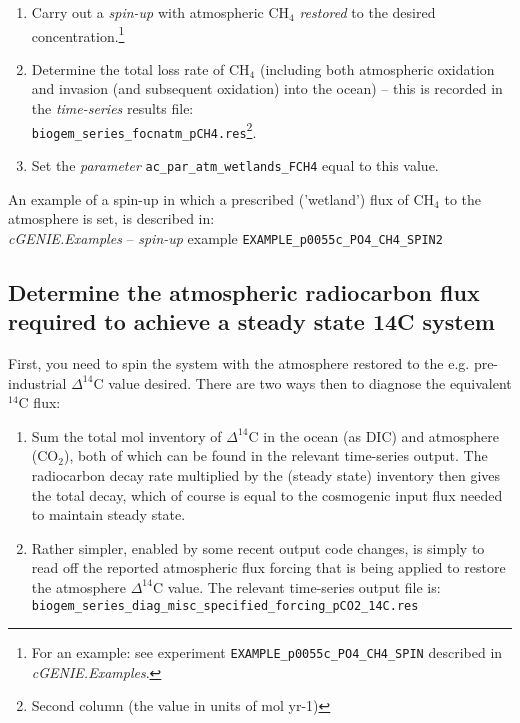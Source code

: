 \begin{enumerate}[noitemsep]

\vspace{1mm}
        \item Carry out a \textit{spin-up} with atmospheric CH\(_{4}\) \textit{restored} to the desired concentration.\footnote{For an example: see experiment \texttt{EXAMPLE\_p0055c\_PO4\_CH4\_SPIN} described in \textit{cGENIE.Examples}.}

\vspace{1mm}
        \item Determine the total loss rate of CH\(_{4}\) (including both atmospheric oxidation and invasion (and subsequent oxidation) into the ocean) -- this is recorded in the \textit{time-series} results file:\\ \texttt{biogem\_series\_focnatm\_pCH4.res}\footnote{Second column (the value in units of mol yr-1)}.

\vspace{1mm}
        \item Set the \textit{parameter} \texttt{ac\_par\_atm\_wetlands\_FCH4} equal to this value.
\end{enumerate}

An example of a spin-up in which a prescribed ('wetland') flux of CH\(_{4}\) to the atmosphere is set, is described in:\\ \textit{cGENIE.Examples} -- \textit{spin-up} example \texttt{EXAMPLE\_p0055c\_PO4\_CH4\_SPIN2}

%
\newpage
\subsection*{Determine the atmospheric radiocarbon flux required to achieve a steady state 14C system}
\vspace{1mm}

First, you need to spin the system with the atmosphere restored to the e.g. pre-industrial \(\Delta^{14}\)C value desired. There are two ways then to diagnose the equivalent \(^{14}\)C flux:

\begin{enumerate}[noitemsep]

\vspace{1mm}
\item Sum the total mol inventory of \(\Delta^{14}\)C in the ocean (as DIC) and atmosphere (CO\(_{2}\)), both of which can be found in the relevant time-series output. The radiocarbon decay rate multiplied by the (steady state) inventory then gives the total decay, which of course is equal to the cosmogenic input flux needed to maintain steady state.

\vspace{1mm}
\item Rather simpler, enabled by some recent output code changes, is simply to read off the reported atmospheric flux forcing that is being applied to restore the atmosphere \(\Delta^{14}\)C value. The relevant time-series output file is:
\\\texttt{biogem\_series\_diag\_misc\_specified\_forcing\_pCO2\_14C.res}

\end{enumerate}

